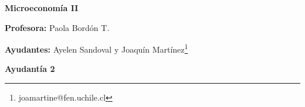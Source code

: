 \documentclass{exam}
\begin{document}
\begin{center}

\LARGE{\textbf{Microeconomía II}}

\medskip
\normalsize \textbf{Profesora:} Paola Bordón T.

\normalsize \textbf{Ayudantes:} Ayelen Sandoval y Joaquín Martínez\footnote{joamartine@fen.uchile.cl}


\medskip
\large{\textbf{Ayudantía 2}}
\end{center}

\tableofcontents





\end{document}

